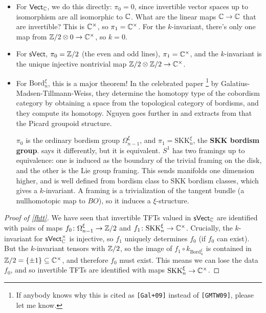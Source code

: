 \begin{itemize}
\setlength\itemsep{-.2em}
    \item For $\mathsf{Vect} _{\mathbb{C}}$, we do this directly: $\pi_0=0$, since invertible vector spaces up to isomorphism are all isomorphic to $\mathbb{C}$. What are the linear maps $\mathbb{C}\to \mathbb{C}$ that are invertible? This is $\mathbb{C}^{\times }$, so $\pi_1=\mathbb{C}^{\times }$. For the $k$-invariant, there's only one map from $\mathbb{Z} /2 \otimes 0 \to \mathbb{C}^{\times }$, so $k=0$.
    \item For $\mathsf{sVect} $, $\pi_0=\mathbb{Z} /2$ (the even and odd lines), $\pi_1=\mathbb{C}^{\times }$, and the $k$-invariant is the unique injective nontrivial map $\mathbb{Z} /2 \otimes \mathbb{Z} /2 \to \mathbb{C}^{\times }$.
    \item For $\mathrm{Bord}_n ^{\xi}$, this is a major theorem! In the celebrated paper \cite{gmtw}\footnote{If anybody knows why this is cited as \texttt{[Gal+09]} instead of \texttt{[GMTW09]}, please let me know.} by Galatius-Madsen-Tillmann-Weiss, they determine the homotopy type of the cobordism category by obtaining a space from the topological category of bordisms, and they compute its homotopy. Nguyen goes further in \cite{nguyen} and extracts from that the Picard groupoid structure.

        $\pi_0$ is the ordinary bordism group $\Omega_{n-1}^{\xi}$, and $\pi_1=\mathrm{SK K}_n ^{\xi}$, the \textbf{SKK bordism group}. \cite{gmtw} says it differently, but it is equivalent. $S^1 $ has two framings up to equivalence: one is induced as the boundary of the trivial framing on the disk, and the other is the Lie group framing. This sends manifolds one dimension higher, and is well defined from bordism class to SKK bordism classes, which gives a $k$-invariant. A framing is a trivialization of the tangent bundle (a nullhomotopic map to $BO$), so it induces a $\xi$-structure.
\end{itemize}

\begin{proof}[Proof of \cref{fhtt}]
We have seen that invertible TFTs valued in $\mathsf{sVect} _{\mathbb{C}}$ are identified with pairs of maps $f_0 \colon \Omega_{n-1}^{\xi} \to \mathbb{Z} /2$ and $f_1 \colon \mathrm{SKK}_n ^{\xi} \to \mathbb{C}^{\times }$. Crucially, the $k$-invariant for $\mathsf{sVect} _{\mathbb{C}}^{\times }$ is injective, so $f_1$ uniquely determines $f_0$ (if $f_0$ can exist). But the $k$-invariant tensors with $\mathbb{Z} /2$, so the image of $f_1 \circ k_{\mathrm{Bord}_n ^{\xi}}$ is contained in $\mathbb{Z} /2= \{\pm 1\} \subseteq \mathbb{C}^{\times }$, and therefore $f_0$ must exist. This means we can lose the data $f_0$, and so invertible TFTs are identified with maps $\mathrm{SK K}_n ^{\xi}\to \mathbb{C}^{\times }$.
\end{proof}

